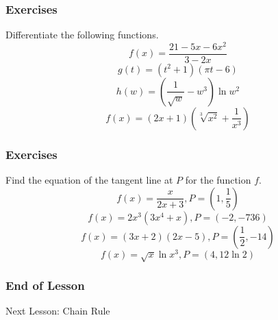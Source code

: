 \documentclass[xcolor=dvipsnames]{beamer}
\begin{document}
\begin{frame}
  \frametitle{Exercises}
  {\ubung} Differentiate the following functions.
  \begin{equation}
    \label{eq:oilaathu}
f(x)=\frac{21-5x-6x^{2}}{3-2x}
  \end{equation}
  \begin{equation}
    \label{eq:ceengewo}
    g(t)=(t^{2}+1)(\pi{}t-6)
  \end{equation}
  \begin{equation}
    \label{eq:oocohzah}
    h(w)=\left(\frac{1}{\sqrt{w}}-w^{3}\right)\ln{}w^{2}
  \end{equation}
  \begin{equation}
    \label{eq:shooquie}
    f(x)=(2x+1)\left(\sqrt[3]{x^{2}}+\frac{1}{x^{3}}\right)
  \end{equation}
\end{frame}

\begin{frame}
  \frametitle{Exercises}
  {\ubung} Find the equation of the tangent line at $P$ for the
  function $f$.
  \begin{equation}
    \label{eq:ohtaiyex}
    f(x)=\frac{x}{2x+3},P=\left(1,\frac{1}{5}\right)
  \end{equation}
  \begin{equation}
    \label{eq:eivibeed}
    f(x)=2x^{3}(3x^{4}+x),P=\left(-2,-736\right)
  \end{equation}
  \begin{equation}
    \label{eq:miengeit}
    f(x)=(3x+2)(2x-5),P=\left(\frac{1}{2},-14\right)
  \end{equation}
  \begin{equation}
    \label{eq:aliheehe}
    f(x)=\sqrt{x}\ln{}x^{3},P=\left(4,12\ln{}2\right)
  \end{equation}
\end{frame}

\begin{frame}
  \frametitle{End of Lesson}
Next Lesson: Chain Rule
\end{frame}
\end{document}

